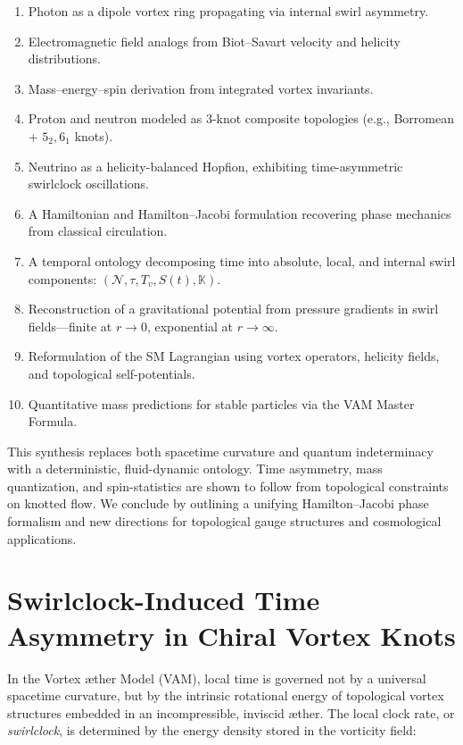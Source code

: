 \documentclass[preprint]{revtex4-2}
\begin{document}
\begin{enumerate}
    \item Photon as a dipole vortex ring propagating via internal swirl asymmetry.
    \item Electromagnetic field analogs from Biot–Savart velocity and helicity distributions.
    \item Mass–energy–spin derivation from integrated vortex invariants.
    \item Proton and neutron modeled as 3-knot composite topologies (e.g., Borromean + \( 5_2, 6_1 \) knots).
    \item Neutrino as a helicity-balanced Hopfion, exhibiting time-asymmetric swirlclock oscillations.
    \item A Hamiltonian and Hamilton–Jacobi formulation recovering phase mechanics from classical circulation.
    \item A temporal ontology decomposing time into absolute, local, and internal swirl components: \( (\mathcal{N}, \tau, T_v, S(t), \mathbb{K}) \).
    \item Reconstruction of a gravitational potential from pressure gradients in swirl fields—finite at \( r \to 0 \), exponential at \( r \to \infty \).
    \item Reformulation of the SM Lagrangian using vortex operators, helicity fields, and topological self-potentials.
    \item Quantitative mass predictions for stable particles via the VAM Master Formula.
\end{enumerate}

This synthesis replaces both spacetime curvature and quantum indeterminacy with a deterministic, fluid-dynamic ontology. Time asymmetry, mass quantization, and spin-statistics are shown to follow from topological constraints on knotted flow. We conclude by outlining a unifying Hamilton–Jacobi phase formalism and new directions for topological gauge structures and cosmological applications.

\section{Swirlclock-Induced Time Asymmetry in Chiral Vortex Knots}

In the Vortex \ae ther Model (VAM), local time is governed not by a universal spacetime curvature, but by the intrinsic rotational energy of topological vortex structures embedded in an incompressible, inviscid \ae ther. The local clock rate, or \emph{swirlclock}, is determined by the energy density stored in the vorticity field:
\end{document}
